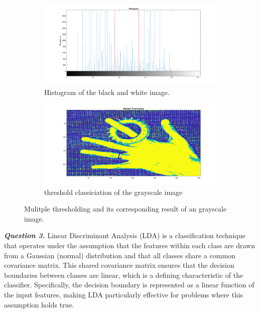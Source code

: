 \documentclass[12pt]{article}
\begin{document}
\begin{figure}[h!]
  \begin{subfigure}[b]{0.5\textwidth}
       \centering
       \includegraphics[width=0.9\linewidth]{images/Q2_hist.png}
       \caption{Histogram of the black and white image.}
       \label{fig:Q2_hist}
   \end{subfigure}
   \hfill
   \begin{subfigure}[b]{0.5\textwidth}
       \centering
       \includegraphics[width=0.9\linewidth]{images/Q2.png}
       \caption{threshold classiciation of the grayscale image}
       \label{fig:Q2_im}
   \end{subfigure}
      \caption{Mulitple thresholding and its corresponding result of an grayscale image.}
      \label{fig:Q2}
\end{figure}


\textbf{\emph{Question 3.}}
Linear Discriminant Analysis (LDA) is a classification technique that operates under the assumption that the features within each class are drawn from a Gaussian (normal) distribution and that all classes share a common covariance matrix. This shared covariance matrix ensures that the decision boundaries between classes are linear, which is a defining characteristic of the classifier. Specifically, the decision boundary is represented as a linear function of the input features, making LDA particularly effective for problems where this assumption holds true.
\end{document}
